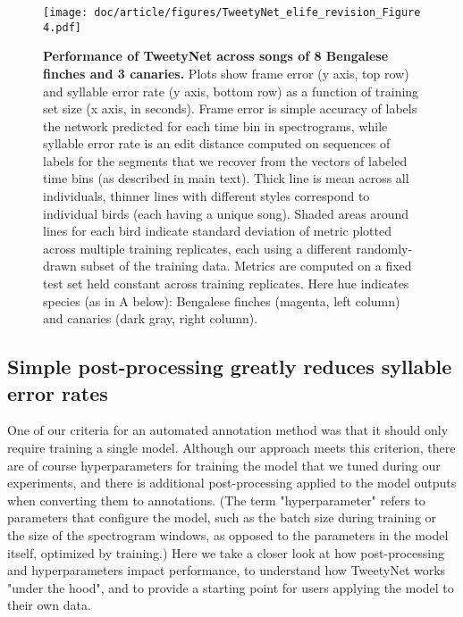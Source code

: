 \documentclass[9pt,lineno]{elife}
\begin{document}
\begin{figure}[!ht] %
\texttt{[image: doc/article/figures/TweetyNet\_elife\_revision\_Figure 4.pdf]}
\caption{{\bf Performance of TweetyNet across songs of 8 Bengalese finches and 3 canaries.}
Plots show frame error (y axis, top row) and syllable error rate (y axis, bottom row) 
as a function of training set size (x axis, in seconds). 
Frame error is simple accuracy of labels the network predicted for each time bin in spectrograms, 
while syllable error rate is an edit distance computed on sequences of labels for the segments that  
we recover from the vectors of labeled time bins (as described in main text).
Thick line is mean across all individuals, 
thinner lines with different styles correspond to individual birds (each having a unique song). 
Shaded areas around lines for each bird indicate standard deviation of metric plotted across multiple training replicates, each using a different randomly-drawn subset of the training data.  
Metrics are computed on a fixed test set held constant across training replicates. 
Here hue indicates species (as in A below): 
Bengalese finches (magenta, left column) and canaries (dark gray, right column).
}
\label{fig:across-individuals-species}
\label{figdata:first}
\label{figdata:second}
\end{figure}

\subsection{Simple post-processing greatly reduces syllable error rates}
\label{results:postprocess-hyperparams}
One of our criteria for an automated annotation method was that it should only require training a single model.
Although our approach meets this criterion, 
there are of course hyperparameters for training the model 
that we tuned during our experiments, 
and there is additional post-processing applied to the model outputs 
when converting them to annotations. 
(The term "hyperparameter" refers to parameters that configure the model, 
such as the batch size during training or the size of the spectrogram windows, 
as opposed to the parameters in the model itself, optimized by training.)
Here we take a closer look at how post-processing and hyperparameters impact performance, 
to understand how TweetyNet works "under the hood", 
and to provide a starting point for users applying the model to their own data.
\end{document}
